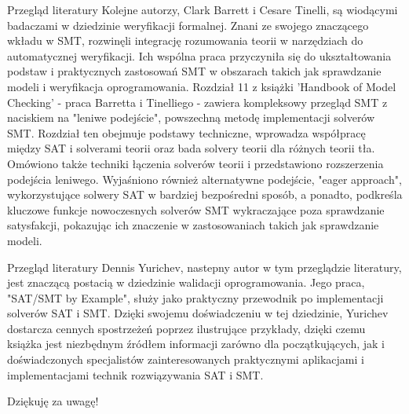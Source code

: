 \documentclass{beamer}
\begin{document}
	\begin{frame}{Przegląd literatury}
		Kolejne autorzy, Clark Barrett i Cesare Tinelli, są wiodącymi badaczami  w dziedzinie weryfikacji formalnej. Znani ze swojego znaczącego wkładu w SMT, rozwinęli integrację rozumowania teorii w narzędziach do automatycznej weryfikacji. Ich wspólna praca przyczyniła się do ukształtowania podstaw i praktycznych zastosowań SMT w obszarach takich jak sprawdzanie modeli i weryfikacja oprogramowania.
		Rozdział 11 z książki 'Handbook of Model Checking' - praca Barretta i Tinelliego - zawiera kompleksowy przegląd SMT z naciskiem na "leniwe podejście", powszechną metodę implementacji solverów SMT. Rozdział ten obejmuje podstawy techniczne, wprowadza współpracę między SAT i solverami teorii oraz bada solvery teorii  dla różnych teorii tła. Omówiono także techniki łączenia solverów teorii  i przedstawiono rozszerzenia podejścia leniwego. Wyjaśniono również alternatywne podejście, "eager approach", wykorzystujące solwery SAT w bardziej bezpośredni sposób, a ponadto, podkreśla kluczowe funkcje nowoczesnych solverów SMT wykraczające poza sprawdzanie satysfakcji, pokazując ich znaczenie  w zastosowaniach takich jak sprawdzanie modeli.
	\end{frame}
	
	
	\begin{frame}{Przegląd literatury}
		Dennis Yurichev, nastepny autor w tym przeglądzie literatury, jest znaczącą postacią w dziedzinie walidacji oprogramowania. Jego praca, "SAT/SMT by Example", służy jako praktyczny przewodnik po implementacji solverów SAT i SMT. Dzięki swojemu doświadczeniu w tej dziedzinie, Yurichev dostarcza cennych spostrzeżeń poprzez ilustrujące przykłady, dzięki czemu książka jest niezbędnym źródłem informacji zarówno dla początkujących, jak  i doświadczonych specjalistów zainteresowanych praktycznymi aplikacjami  i implementacjami technik rozwiązywania SAT i SMT.
	\end{frame}
	
	
	\begin{frame}
		\Huge{\centerline{Dziękuję za uwagę!}}
	\end{frame}

	
\end{document}
